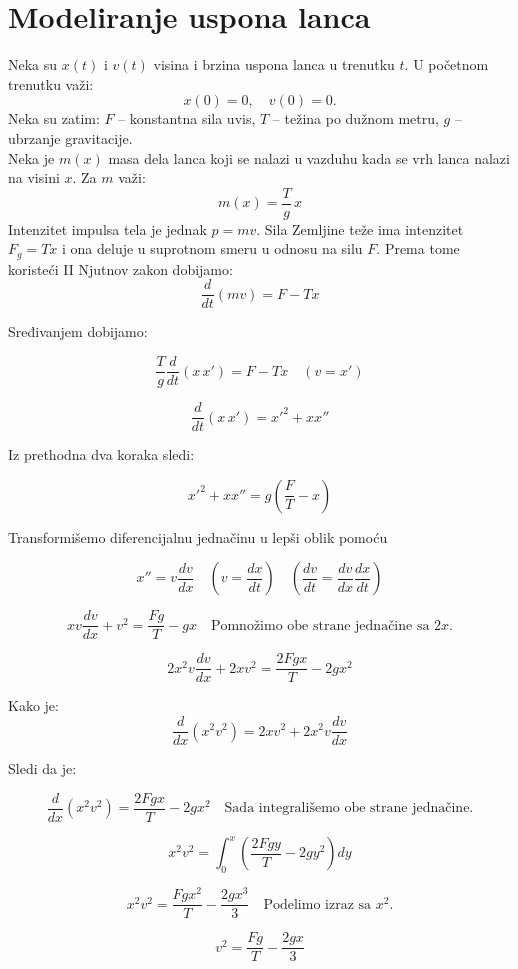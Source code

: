 \documentclass[a4paper]{article}
\begin{document}
\section{Modeliranje uspona lanca}
Neka su $x(t)$ i $v(t)$ visina i brzina uspona lanca u trenutku $t$. U početnom trenutku važi:
\[
x\left( 0 \right)=0,\quad v\left( 0 \right)=0.
\]
Neka su zatim:
$F$ -- konstantna sila uvis,
$T$ -- težina po dužnom metru,
$g$ -- ubrzanje gravitacije.\\

Neka je $m(x)$ masa dela lanca koji se nalazi u vazduhu kada se vrh 
lanca nalazi na visini $x$. Za $m$ važi:
\[
m\left(x\right) = \frac{T}{g}\,x
\]
Intenzitet impulsa tela je jednak $p = mv$.\cite{urone2020physics} Sila Zemljine teže
ima intenzitet $F_{g} = Tx$ i ona deluje u suprotnom smeru u odnosu na
silu $F$. Prema tome koristeći II Njutnov zakon dobijamo:
\[
\frac{d}{dt}\left(mv\right)=F-Tx 
\]


Sređivanjem dobijamo:

\[
\frac{T}{g}\frac{d}{dt}\left(x \, x'\right) = F - Tx \quad \left(v = x' \right)
\]


\[
\frac{d}{dt}\left(x \, x'\right) = x'^{2} + xx'' 
\]

Iz prethodna dva koraka sledi:

\[
x'^{2} + xx'' = g\left(\frac{F}{T} - x\right)
\]

Transformišemo diferencijalnu jednačinu u lepši oblik pomoću

\[
x'' = v\frac{dv}{dx} \quad \left(v = \frac{dx}{dt}\right) \quad \left(\frac{dv}{dt} = \frac{dv}{dx}\frac{dx}{dt}\right) 
\]

\[
xv\frac{dv}{dx} + v^{2} = \frac{Fg}{T} - gx \quad \text{Pomnožimo obe strane jednačine sa } 2x.
\]

\[
2x^{2}v\frac{dv}{dx} + 2xv^{2} = \frac{2Fgx}{T} - 2gx^{2} 
\]

Kako je: 
\[
\frac{d}{dx}\left(x^{2}v^{2}\right) = 2xv^{2} + 2x^{2}v\frac{dv}{dx}
\]

Sledi da je:

\[
\frac{d}{dx}\left(x^{2}v^{2}\right) = \frac{2Fgx}{T} - 2gx^{2} \quad \text{Sada integrališemo obe strane jednačine.} 
\]

\[
x^{2}v^{2} = \int_0^x \left(\frac{2Fgy}{T} - 2gy^{2}\right)dy
\]

\[
x^{2}v^{2} = \frac{Fgx^{2}}{T} - \frac{2gx^{3}}{3}  \quad \text{Podelimo izraz sa } x^{2}.
\]

\[
v^{2} = \frac{Fg}{T} - \frac{2gx}{3}
\]
\end{document}
